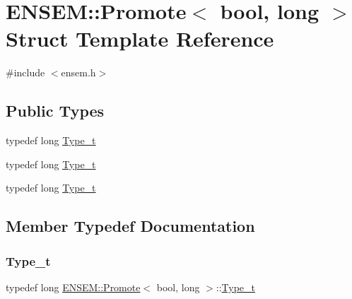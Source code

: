 \hypertarget{structENSEM_1_1Promote_3_01bool_00_01long_01_4}{}\section{E\+N\+S\+EM\+:\+:Promote$<$ bool, long $>$ Struct Template Reference}
\label{structENSEM_1_1Promote_3_01bool_00_01long_01_4}


{\ttfamily \#include $<$ensem.\+h$>$}

\subsection*{Public Types}
\begin{DoxyCompactItemize}
\item 
typedef long \mbox{\hyperlink{structENSEM_1_1Promote_3_01bool_00_01long_01_4_a92d4af8adfcc1f69cde4f02b85f783c9}{Type\+\_\+t}}
\item 
typedef long \mbox{\hyperlink{structENSEM_1_1Promote_3_01bool_00_01long_01_4_a92d4af8adfcc1f69cde4f02b85f783c9}{Type\+\_\+t}}
\item 
typedef long \mbox{\hyperlink{structENSEM_1_1Promote_3_01bool_00_01long_01_4_a92d4af8adfcc1f69cde4f02b85f783c9}{Type\+\_\+t}}
\end{DoxyCompactItemize}


\subsection{Member Typedef Documentation}
\mbox{\label{structENSEM_1_1Promote_3_01bool_00_01long_01_4_a92d4af8adfcc1f69cde4f02b85f783c9}} 
\subsubsection{\texorpdfstring{Type\_t}{Type\_t}\hspace{0.1cm}{\footnotesize\ttfamily [1/3]}}
{\footnotesize\ttfamily typedef long \mbox{\hyperlink{structENSEM_1_1Promote}{E\+N\+S\+E\+M\+::\+Promote}}$<$ bool, long $>$\+::\mbox{\hyperlink{structENSEM_1_1Promote_3_01bool_00_01long_01_4_a92d4af8adfcc1f69cde4f02b85f783c9}{Type\+\_\+t}}}

\mbox{\label{structENSEM_1_1Promote_3_01bool_00_01long_01_4_a92d4af8adfcc1f69cde4f02b85f783c9}} 
